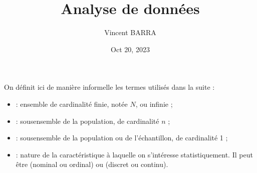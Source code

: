 \documentclass[letterpaper,10pt,english]{jupyterBook}
\title{Analyse de données}
\date{Oct 20, 2023}
\author{Vincent BARRA}
\begin{document}
\pagestyle{empty}
\sphinxmaketitle
\pagestyle{plain}
\sphinxtableofcontents
\pagestyle{normal}
\label{\detokenize{intro::doc}}


\begin{DUlineblock}{0em}
\item[] 
\end{DUlineblock}

\sphinxAtStartPar
On définit ici de manière informelle les termes utilisés dans la suite :

\ignorespaces \begin{itemize}
\item {} 
\sphinxAtStartPar
{} : ensemble de cardinalité finie, notée \(N\), ou infinie ;

\end{itemize}

\ignorespaces \begin{itemize}
\item {} 
\sphinxAtStartPar
{} : sous\sphinxhyphen{}ensemble de la population, de cardinalité \(n\) ;

\end{itemize}

\ignorespaces \begin{itemize}
\item {} 
\sphinxAtStartPar
{} : sous\sphinxhyphen{}ensemble de la population ou de l’échantillon, de cardinalité 1 ;

\end{itemize}

\ignorespaces \begin{itemize}
\item {} 
\sphinxAtStartPar
{} : nature de la caractéristique à laquelle on s’intéresse statistiquement. Il peut être  (nominal ou ordinal) ou  (discret ou continu).

\end{itemize}

\begin{DUlineblock}{0em}
\item[] 
\end{DUlineblock}
\end{document}
